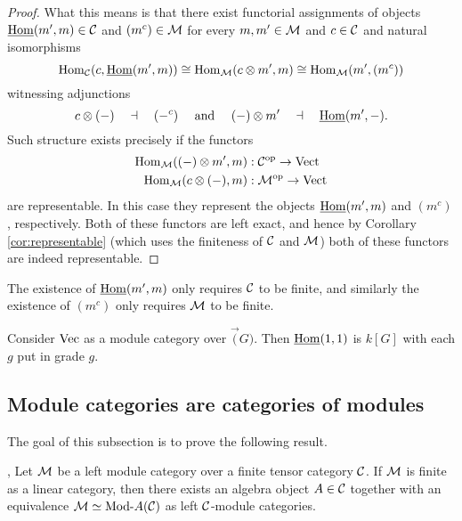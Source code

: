 \documentclass{amsart}
\begin{document}
\begin{proof}
	What this means is that there exist functorial assignments of objects $\IHom(m', m) \in \cC$ and $(m^c) \in \cM$ for every $m,m' \in \cM$ and $c \in \cC$ and natural isomorphisms
	\begin{equation*}
		\Hom_\cC(c, \IHom(m', m)) \cong \Hom_\cM(c \otimes m', m) \cong \Hom_\cM( m', (m^c))
	\end{equation*}
	witnessing adjunctions
	\begin{equation*}
			c \otimes (-) \quad \dashv\quad (-^c) \quad \textrm{ and } \quad (-) \otimes m' \quad \dashv \quad \IHom(m', -).
	\end{equation*}
Such structure exists precisely if the functors
\begin{align*}
	\Hom_\cM((-)\otimes m', m): \; & \cC^\op \to \Vect \\
	\Hom_\cM(c \otimes (-), m): \; & \cM^\op \to \Vect
\end{align*}
are representable. In this case they represent the objects $\IHom(m', m)$ and $(m^c)$, respectively. Both of these functors are left exact, and hence by Corollary \ref{cor:representable} (which uses the finiteness of $\cC$ and $\cM$) both of these functors are indeed representable.  
\end{proof}

\begin{remark}
	The existence of $\IHom(m', m)$ only requires $\cC$ to be finite, and similarly the existence of $(m^c)$ only requires $\cM$ to be finite.
\end{remark}

\begin{example}
Consider $\Vec$ as a module category over $\Vec(G)$.  Then $\IHom(1,1)$ is $k[G]$ with each $g$ put in grade $g$.
\end{example}


\subsection{Module categories are categories of modules}

The goal of this subsection is to prove the following result.

\begin{theorem}{\cite[Thm 2.11.6]{EGNO}, \cite[Thm 1]{MR1976459}} \label{thm:EGNO2.11.6}
	Let $\cM$ be a left module category over a finite tensor category $\cC$. If $\cM$ is finite as a linear category, then there exists an algebra object $A \in \cC$ together with an equivalence $\cM \simeq \Mod{}{A} (\cC)$ as left $\cC$-module categories.
\end{theorem}
\end{document}
